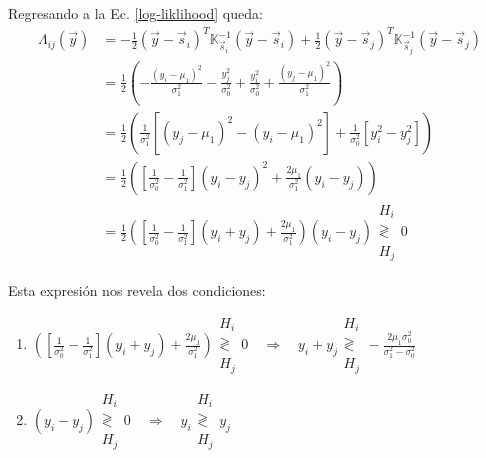 \documentclass{article}
\begin{document}
    Regresando a la Ec. \ref{log-liklihood} queda:
    \begin{align}
        \Lambda_{ij}(\vec{y}) &= -\frac{1}{2}(\vec{y}-\vec{s}_i)^T\mathbb{K}_{\vec{s}_i}^{-1}(\vec{y}-\vec{s}_i) + \frac{1}{2}(\vec{y}-\vec{s}_j)^T\mathbb{K}_{\vec{s}_j}^{-1}(\vec{y}-\vec{s}_j) \nonumber\\
        &= \frac{1}{2} \left( -\frac{(y_i-\mu_1)^2}{\sigma_1^2} - \frac{y_j^2}{\sigma_0^2} + \frac{y_i^2}{\sigma_0^2} + \frac{(y_j-\mu_1)^2}{\sigma_1^2} \right) \nonumber\\
        &= \frac{1}{2} \left( \frac{1}{\sigma_1^2}\left[(y_j-\mu_1)^2-(y_i-\mu_1)^2\right] + \frac{1}{\sigma_0^2}\left[y_i^2-y_j^2\right]  \right) \nonumber\\
        &= \frac{1}{2} \left( \left[ \frac{1}{\sigma_0^2} - \frac{1}{\sigma_1^2} \right](y_i-y_j)^2 + \frac{2\mu_1}{\sigma_1^2}(y_i-y_j)  \right) \nonumber\\
        &= \frac{1}{2} \left( \left[ \frac{1}{\sigma_0^2} - \frac{1}{\sigma_1^2} \right](y_i+y_j) + \frac{2\mu_1}{\sigma_1^2}  \right)(y_i-y_j)
        \begin{array}{c}
            H_i \\
            \gtrless \\
            H_j
        \end{array} 0 
    \end{align}

    Esta expresión nos revela dos condiciones:
    \begin{enumerate}
        \item $\left( \left[ \frac{1}{\sigma_0^2} - \frac{1}{\sigma_1^2} \right](y_i+y_j) + \frac{2\mu_1}{\sigma_1^2}  \right) \begin{array}{c}
            H_i \\
            \gtrless \\
            H_j
        \end{array} 0 \quad \Longrightarrow \quad 
        y_i+y_j \begin{array}{c}
            H_i \\
            \gtrless \\
            H_j
        \end{array} -\frac{2\mu_1\sigma_0^2}{\sigma_1^2-\sigma_0^2} $
        
        \item $(y_i-y_j) \begin{array}{c}
            H_i \\
            \gtrless \\
            H_j
        \end{array} 0 \quad \Longrightarrow \quad
        y_i \begin{array}{c}
            H_i \\
            \gtrless \\
            H_j
        \end{array} y_j$
    \end{enumerate}
\end{document}
